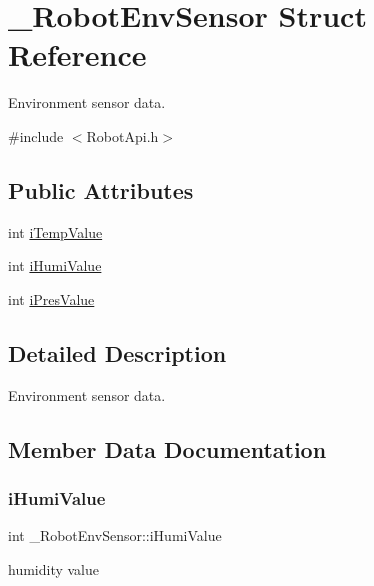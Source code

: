 \hypertarget{struct__RobotEnvSensor}{}\section{\+\_\+\+Robot\+Env\+Sensor Struct Reference}
\label{struct__RobotEnvSensor}


Environment sensor data.  




{\ttfamily \#include $<$Robot\+Api.\+h$>$}

\subsection*{Public Attributes}
\begin{DoxyCompactItemize}
\item 
int \hyperlink{struct__RobotEnvSensor_ab0ae3d1ccf7267172b5e03e36fb9b469}{i\+Temp\+Value}
\item 
int \hyperlink{struct__RobotEnvSensor_ac1bc83ccd0caff88b187ff45ce320d9b}{i\+Humi\+Value}
\item 
int \hyperlink{struct__RobotEnvSensor_ae80bf4f6e67afa6d239b31fa5b8d732e}{i\+Pres\+Value}
\end{DoxyCompactItemize}


\subsection{Detailed Description}
Environment sensor data. 

\subsection{Member Data Documentation}
\mbox{\label{struct__RobotEnvSensor_ac1bc83ccd0caff88b187ff45ce320d9b}} 
\subsubsection{\texorpdfstring{i\+Humi\+Value}{iHumiValue}}
{\footnotesize\ttfamily int \+\_\+\+Robot\+Env\+Sensor\+::i\+Humi\+Value}

humidity value \mbox{\label{struct__RobotEnvSensor_ae80bf4f6e67afa6d239b31fa5b8d732e}} 
